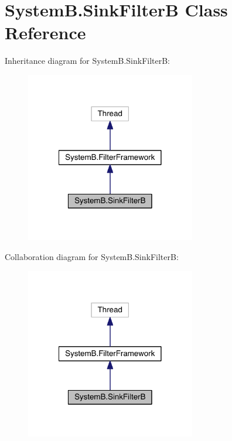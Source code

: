 \hypertarget{class_system_b_1_1_sink_filter_b}{}\section{System\+B.\+Sink\+Filter\+B Class Reference}
\label{class_system_b_1_1_sink_filter_b}


Inheritance diagram for System\+B.\+Sink\+Filter\+B\+:
\nopagebreak
\begin{figure}[H]
\begin{center}
\leavevmode
\includegraphics[width=210pt]{class_system_b_1_1_sink_filter_b__inherit__graph}
\end{center}
\end{figure}


Collaboration diagram for System\+B.\+Sink\+Filter\+B\+:
\nopagebreak
\begin{figure}[H]
\begin{center}
\leavevmode
\includegraphics[width=210pt]{class_system_b_1_1_sink_filter_b__coll__graph}
\end{center}
\end{figure}
